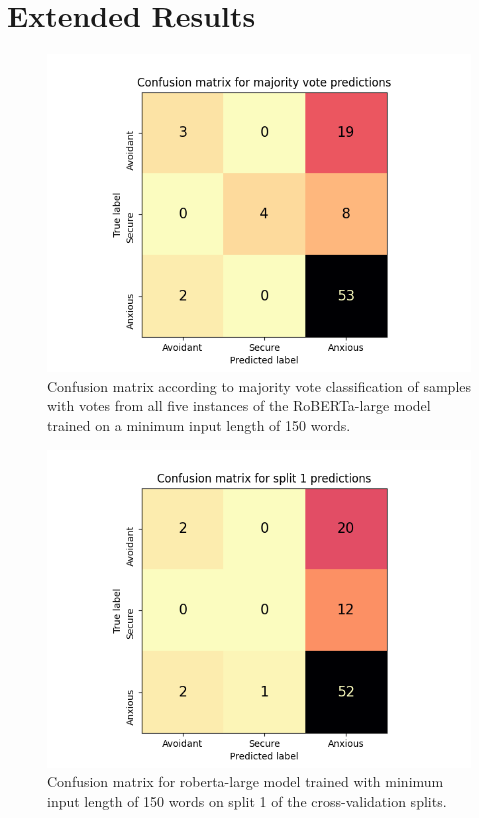 \documentclass[12pt]{report}
\begin{document}
\chapter{Extended Results}
\label{App: confusion matrices}

\begin{figure}
    \includegraphics[width=\textwidth]{figures/roberta-large_150_combined_confusion_matrix.png}
    \caption{Confusion matrix according to majority vote classification of samples with votes from all five instances of the RoBERTa-large model trained on a minimum input length of 150 words.}
    \label{fig: combined confusion matrix}
\end{figure}

\begin{figure}
    \includegraphics[width=\textwidth]{figures/roberta-large_150_split1_confusion_matrix.png}
    \caption{Confusion matrix for roberta-large model trained with minimum input length of 150 words on split 1 of the cross-validation splits.}
    \label{fig: cm split1}
\end{figure}
\end{document}
